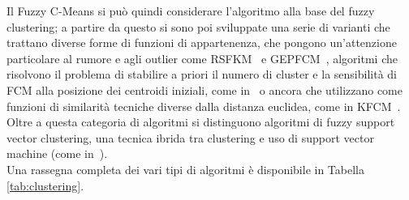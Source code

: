 \documentclass[oneside, openany]{book}
\begin{document}
		Il Fuzzy C-Means si può quindi considerare l'algoritmo alla base del fuzzy clustering; a partire da questo si sono poi sviluppate una serie di varianti che trattano diverse forme di funzioni di appartenenza, che pongono un'attenzione particolare al rumore e agli outlier come RSFKM~\cite{bib:rsfkm} e GEPFCM~\cite{bib:gifpfcm}, algoritmi che risolvono il problema di stabilire a priori il numero di cluster e la sensibilità di FCM alla posizione dei centroidi iniziali, come in~\cite{bib:afkm} o ancora che utilizzano come funzioni di similarità tecniche diverse dalla distanza euclidea, come in KFCM~\cite{bib:kfcm}.
		\\
		Oltre a questa categoria di algoritmi si distinguono algoritmi di fuzzy support vector clustering, una tecnica ibrida tra clustering e uso di support vector machine (come in~\cite{bib:svc,bib:msvc}).
		\\
		Una rassegna completa dei vari tipi di algoritmi è disponibile in Tabella \ref{tab:clustering}.
\end{document}
